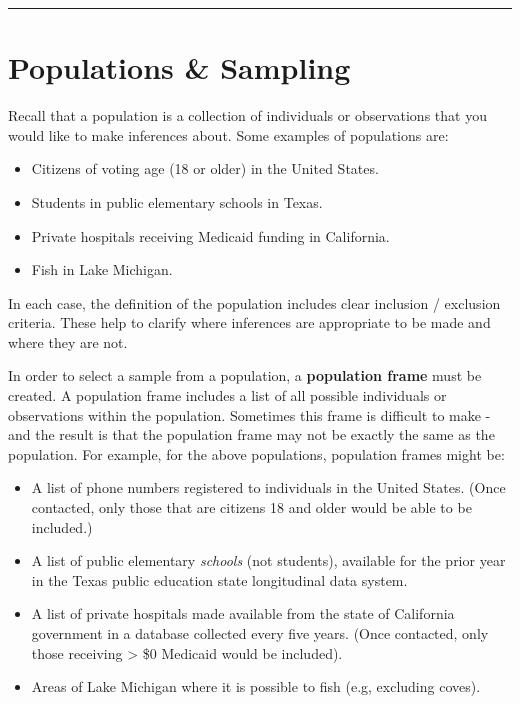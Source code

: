 \documentclass[
  letterpaper,
  DIV=11,
  numbers=noendperiod]{scrreprt}
\providecommand{\tightlist}{%
  \setlength{\itemsep}{0pt}\setlength{\parskip}{0pt}}\usepackage{longtable,booktabs,array}
\theoremstyle{definition}
\theoremstyle{remark}
\begin{document}
\begin{center}\rule{0.5\linewidth}{0.5pt}\end{center}

\hypertarget{sec-sample-selection}{%
\section{Populations \& Sampling}\label{sec-sample-selection}}

Recall that a population is a collection of individuals or observations
that you would like to make inferences about. Some examples of
populations are:

\begin{itemize}
\tightlist
\item
  Citizens of voting age (18 or older) in the United States.
\item
  Students in public elementary schools in Texas.
\item
  Private hospitals receiving Medicaid funding in California.
\item
  Fish in Lake Michigan.
\end{itemize}

In each case, the definition of the population includes clear inclusion
/ exclusion criteria. These help to clarify where inferences are
appropriate to be made and where they are not.

In order to select a sample from a population, a \textbf{population
frame} must be created. A population frame includes a list of all
possible individuals or observations within the population. Sometimes
this frame is difficult to make - and the result is that the population
frame may not be exactly the same as the population. For example, for
the above populations, population frames might be:

\begin{itemize}
\tightlist
\item
  A list of phone numbers registered to individuals in the United
  States. (Once contacted, only those that are citizens 18 and older
  would be able to be included.)
\item
  A list of public elementary \emph{schools} (not students), available
  for the prior year in the Texas public education state longitudinal
  data system.
\item
  A list of private hospitals made available from the state of
  California government in a database collected every five years. (Once
  contacted, only those receiving \textgreater{} \$0 Medicaid would be
  included).
\item
  Areas of Lake Michigan where it is possible to fish (e.g, excluding
  coves).
\end{itemize}
\end{document}
